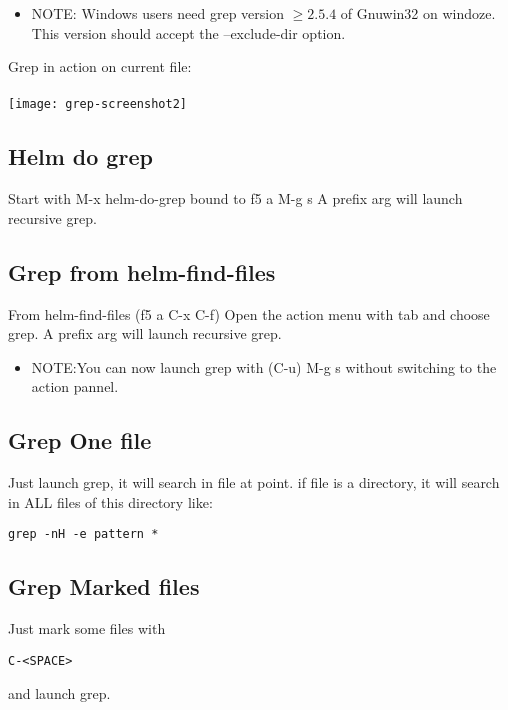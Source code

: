 \documentclass[a4paper,11pt]{article}
\begin{document}
\begin{itemize}
\item NOTE: Windows users need grep version 
\begin{math}
\geq2.5.4
\end{math}
of Gnuwin32 on windoze.
This version should accept the --exclude-dir option.
\end{itemize}

\newpage
Grep in action on current file: \\
\\
\texttt{[image: grep-screenshot2]}

\subsection{Helm do grep}
\label{sec:helm-do-grep}
Start with M-x helm-do-grep bound to f5 a M-g s
A prefix arg will launch recursive grep.

\subsection{Grep from helm-find-files}
\label{sec:grep-from-helm}
From helm-find-files (f5 a C-x C-f) Open the action menu with tab and choose grep.
A prefix arg will launch recursive grep.\\

\begin{itemize}
\item NOTE:You can now launch grep with (C-u) M-g s without switching to the action pannel.
\end{itemize}

\subsection{Grep One file}
\label{sec:grep-one-file}
Just launch grep, it will search in file at point.
if file is a directory, it will search in ALL files of this directory like:

\begin{verbatim}
grep -nH -e pattern *
\end{verbatim}


\subsection{Grep Marked files}
\label{sec:grep-marked-files}
Just mark some files with
\begin{verbatim}
C-<SPACE>
\end{verbatim}
and launch grep.
\end{document}

